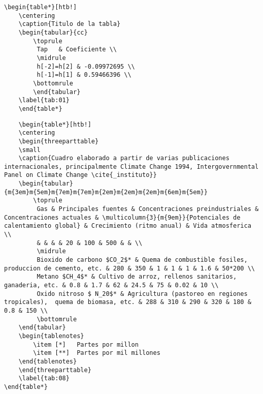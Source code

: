 \documentclass[12pt]{difu100cia} %
\begin{document}
\begin{lstlisting}[basicstyle=\small]
\begin{table*}[htb!]
    \centering
    \caption{Titulo de la tabla} 
    \begin{tabular}{cc} 
        \toprule
         Tap   & Coeficiente \\ 
         \midrule
         h[-2]=h[2] & -0.09972695 \\
         h[-1]=h[1] & 0.59466396 \\
        \bottomrule
        \end{tabular}
    \label{tab:01}
    \end{table*}
\end{lstlisting}

\begin{lstlisting}
    \begin{table*}[htb!]
    \centering
    \begin{threeparttable}
    \small
    \caption{Cuadro elaborado a partir de varias publicaciones internacionales, principalmente Climate Change 1994, Intergovernmental Panel on Climate Change \cite{_instituto}}
    \begin{tabular}{m{3em}m{5em}m{7em}m{7em}m{2em}m{2em}m{2em}m{6em}m{5em}}
        \toprule
         Gas & Principales fuentes & Concentraciones preindustriales & Concentraciones actuales & \multicolumn{3}{m{9em}}{Potenciales de calentamiento global} & Crecimiento (ritmo anual) & Vida atmosferica \\
         & & & & 20 & 100 & 500 & & \\
         \midrule
         Bioxido de carbono $CO_2$* & Quema de combustible fosiles, produccion de cemento, etc. & 280 & 350 & 1 & 1 & 1 & 1.6 & 50*200 \\
         Metano $CH_4$* & Cultivo de arroz, rellenos sanitarios, ganaderia, etc. & 0.8 & 1.7 & 62 & 24.5 & 75 & 0.02 & 10 \\
         Oxido nitroso $ N_20$* & Agricultura (pastoreo en regiones tropicales),  quema de biomasa, etc. & 288 & 310 & 290 & 320 & 180 & 0.8 & 150 \\
         \bottomrule
    \end{tabular}
    \begin{tablenotes}
        \item [*]	Partes por millon
        \item [**]	Partes por mil millones
    \end{tablenotes}
    \end{threeparttable}
    \label{tab:08}
\end{table*}

\end{lstlisting}
\end{document}
